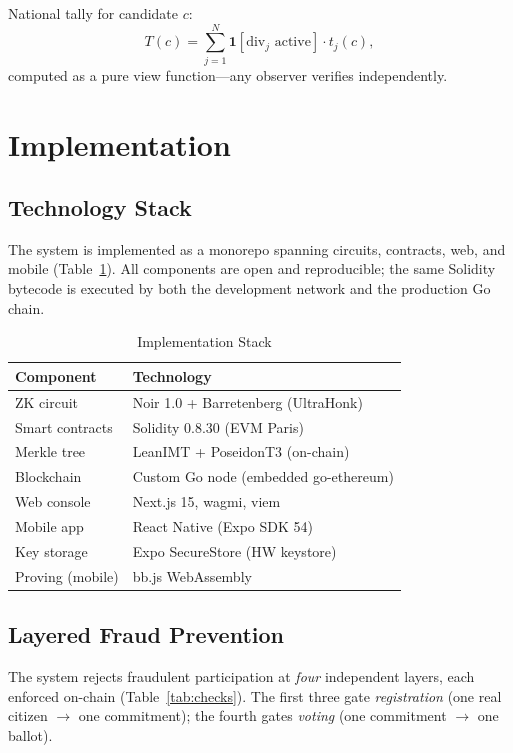 \documentclass[conference]{IEEEtran}
\theoremstyle{definition}
\theoremstyle{plain}
\begin{document}
National tally for candidate $c$:
\begin{equation}
T(c)=\sum_{j=1}^{N}\mathbf{1}[\text{div}_j\text{ active}]\cdot t_j(c),
\label{eq:tally}
\end{equation}
computed as a pure view function---any observer verifies independently.

\section{Implementation}

\subsection{Technology Stack}
The system is implemented as a monorepo spanning circuits, contracts, web, and mobile (Table~\ref{tab:stack}). All components are open and reproducible; the same Solidity bytecode is executed by both the development network and the production Go chain.

\begin{table}[t]
\caption{Implementation Stack}
\centering\small
\begin{tabular}{@{}ll@{}}
\toprule
\textbf{Component} & \textbf{Technology} \\
\midrule
ZK circuit & Noir 1.0 + Barretenberg (UltraHonk) \\
Smart contracts & Solidity 0.8.30 (EVM Paris) \\
Merkle tree & LeanIMT + PoseidonT3 (on-chain) \\
Blockchain & Custom Go node (embedded go-ethereum) \\
Web console & Next.js 15, wagmi, viem \\
Mobile app & React Native (Expo SDK 54) \\
Key storage & Expo SecureStore (HW keystore) \\
Proving (mobile) & bb.js WebAssembly \\
\bottomrule
\end{tabular}
\label{tab:stack}
\end{table}

\subsection{Layered Fraud Prevention}
\label{sec:fraud}
The system rejects fraudulent participation at \emph{four} independent layers, each enforced on-chain (Table~\ref{tab:checks}). The first three gate \emph{registration} (one real citizen $\to$ one commitment); the fourth gates \emph{voting} (one commitment $\to$ one ballot).
\end{document}
